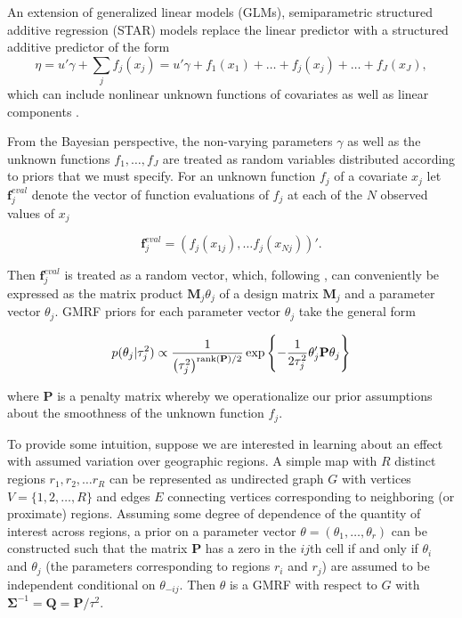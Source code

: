 An extension of generalized linear models (GLMs), semiparametric structured additive regression (STAR) models replace the linear predictor with a structured additive predictor of the form
%
\begin{equation*}
\eta =  u'\gamma + \sum_{j} f_j (x_j) =  u'\gamma + f_1(x_1) + \ldots + f_j(x_j) + \ldots + f_J(x_J),
\end{equation*}
%
\noindent which can include nonlinear unknown functions of covariates as well as linear components . 

From the Bayesian perspective, the non-varying parameters $\gamma$ as well as the unknown functions $f_1, \dots, f_J$ are treated as random variables distributed according to priors that we must specify. For an unknown function $f_j$ of a covariate $x_j$ let $\mathbf{f}_j^{eval}$ denote the vector of function evaluations of $f_j$ at each of the $N$ observed values of $x_j$ 

\begin{equation*}
\mathbf{f}_j^{eval} = \left(f_j(x_{1j}), \dots f_j(x_{Nj})\right)'.  
 \end{equation*}
 
\noindent Then $\mathbf{f}_j^{eval}$ is treated as a random vector, which, following , can conveniently be expressed as the matrix product $\mathbf{M}_j \theta_j$ of a design matrix $\mathbf{M}_j$ and a parameter vector $\theta_j$. GMRF priors for each parameter vector $\theta_j$ take the general form

\begin{equation*}
p(\theta_j | \tau^2_j) 
\propto 
\frac{1}{\left(\tau^2_j\right)^{{\rm rank}(\mathbf{P})/2} }
\exp{\left\{-\frac{1}{2\tau^2_j} \theta_j' \mathbf{P} \theta_j\right\}}
\end{equation*}

\noindent where $\mathbf{P}$ is a penalty matrix whereby we operationalize our prior assumptions about the smoothness of the unknown function $f_j$. 

To provide some intuition, suppose we are interested in learning about an effect with assumed variation over geographic regions.  A simple map with $R$ distinct regions $r_1, r_2, \dots r_R$ can be represented as undirected graph $G$ with vertices $V = \{1, 2, \dots, R\}$ and edges $E$ connecting vertices corresponding to neighboring (or proximate) regions. Assuming some degree of dependence of the quantity of interest across regions, a prior on a parameter vector $\theta = (\theta_1, \dots, \theta_r)$ can be constructed such that the matrix $\mathbf{P}$ has a zero in the $ij$th cell if and only if $\theta_i$ and $\theta_j$ (the parameters corresponding to regions $r_i$ and $r_j$) are assumed to be independent conditional on $\theta_{-ij}$. Then $\theta$ is a GMRF with respect to $G$ with $\boldsymbol{\Sigma}^{-1} = \mathbf{Q} = \mathbf{P}/\tau^2$. 

